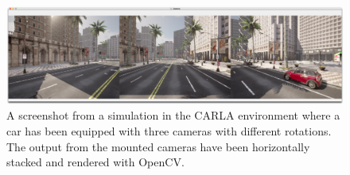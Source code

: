 \begin{figure}[ht]
    \centering
    \includegraphics[width=1.0\textwidth]{figures/carla-3-camera-setup.png}
    \caption[Screenshot from the CARLA simulator.]{A screenshot from a simulation in the CARLA environment where a car has been equipped with three cameras with different rotations. The output from the mounted cameras have been horizontally stacked and rendered with OpenCV\cite{opencv_library}.}
    \label{fig:carla-3-camera-setup}
\end{figure}